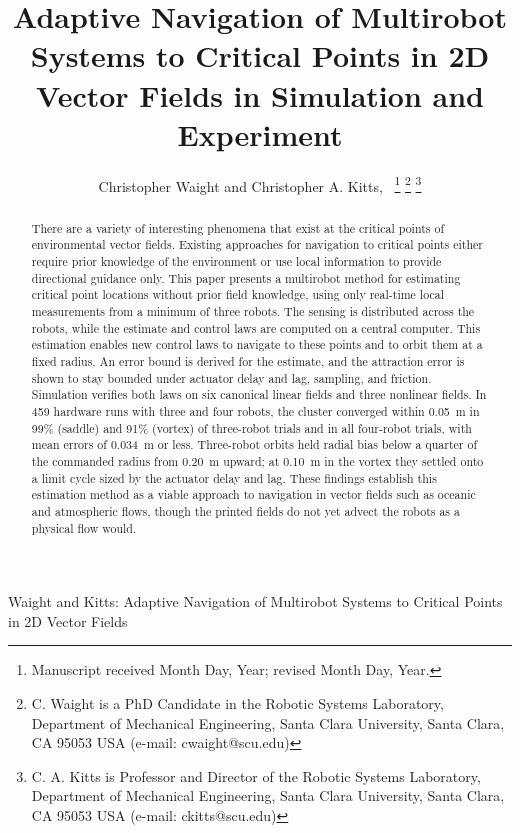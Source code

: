\documentclass[lettersize,journal]{IEEEtran}
\newcommand{\rev}[1]{#1}
\begin{document}
\title{Adaptive Navigation of Multirobot Systems to Critical Points in 2D Vector Fields in Simulation and Experiment}
\author{Christopher Waight and Christopher A. Kitts,~
\thanks{Manuscript received Month Day, Year; revised Month Day, Year.}
\thanks{C. Waight is a PhD Candidate in the Robotic Systems Laboratory, Department of Mechanical Engineering, Santa Clara University, Santa Clara, CA 95053 USA (e-mail: cwaight@scu.edu)}
\thanks{C. A. Kitts is Professor and Director of the Robotic Systems Laboratory, Department of Mechanical Engineering, Santa Clara University, Santa Clara, CA 95053 USA (e-mail: ckitts@scu.edu)}
}
%
{Waight and Kitts: Adaptive Navigation of Multirobot Systems to Critical Points in 2D Vector Fields}


\maketitle

\begin{abstract}
    There are a variety of interesting phenomena that exist at the critical points of environmental vector fields. Existing approaches for navigation to critical points either require prior knowledge of the environment or use local information to provide directional guidance only. This paper presents a multirobot method for estimating critical point locations without prior field knowledge, using only real-time local measurements from a minimum of three robots. The sensing is distributed across the robots, while the estimate and control laws are computed on a central computer.
    This estimation enables new control laws to navigate to these points and to orbit them at a fixed radius.
    An error bound is derived for the estimate, and the attraction error is shown to stay bounded under actuator delay and lag, sampling, and friction.
    Simulation verifies both laws on six canonical linear fields and three nonlinear fields. In \rev{459} hardware runs with three and four robots, the cluster converged within 0.05~m in \rev{99}\% (saddle) and \rev{91}\% (vortex) of three-robot trials and in all four-robot trials, with mean errors of \rev{0.034}~m or less. Three-robot orbits held radial bias below a quarter of the commanded radius from \rev{0.20}~m upward; at 0.10~m in the vortex they settled onto a limit cycle sized by the actuator delay and lag.
    These findings establish this estimation method as a viable approach to navigation in vector fields such as oceanic and atmospheric flows, though the printed fields do not yet advect the robots as a physical flow would.

\end{abstract}
\end{document}
